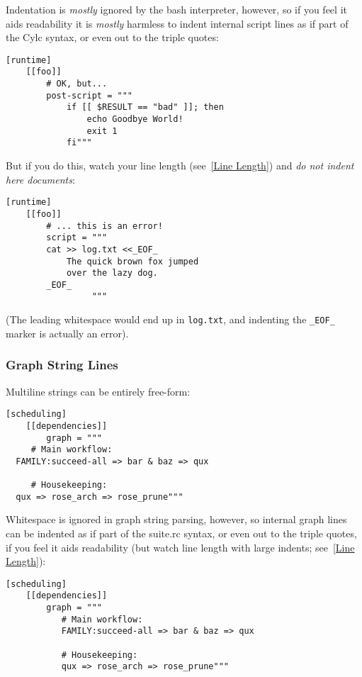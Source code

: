Indentation is {\em mostly} ignored by the bash interpreter, however, so if you
feel it aids readability it is {\em mostly} harmless to indent internal script
lines as if part of the Cylc syntax, or even out to the triple quotes:

\lstset{language=suiterc}
\begin{lstlisting}
[runtime]
    [[foo]]
        # OK, but...
        post-script = """
            if [[ $RESULT == "bad" ]]; then
                echo Goodbye World!
                exit 1
            fi"""
\end{lstlisting}

But if you do this, watch your line length (see~\ref{Line Length}) and {\em do not
indent here documents}:

\lstset{language=suiterc}
\begin{lstlisting}
[runtime]
    [[foo]]
        # ... this is an error!
        script = """
        cat >> log.txt <<_EOF_
            The quick brown fox jumped
            over the lazy dog.
        _EOF_
                 """
\end{lstlisting}

(The leading whitespace would end up in \lstinline=log.txt=, and indenting the
\lstinline=_EOF_= marker is actually an error).

\subsubsection{Graph String Lines}

Multiline \lstinline@graph@ strings can be entirely free-form:

\lstset{language=suiterc}
\begin{lstlisting}
[scheduling]
    [[dependencies]]
        graph = """
     # Main workflow:
  FAMILY:succeed-all => bar & baz => qux

     # Housekeeping:
  qux => rose_arch => rose_prune"""
\end{lstlisting}

Whitespace is ignored in graph string parsing, however, so internal graph lines
can be indented as if part of the suite.rc syntax, or even out to the triple
quotes, if you feel it aids readability (but watch line length with large
indents; see~\ref{Line Length}):

\lstset{language=suiterc}
\begin{lstlisting}
[scheduling]
    [[dependencies]]
        graph = """
           # Main workflow:
           FAMILY:succeed-all => bar & baz => qux

           # Housekeeping:
           qux => rose_arch => rose_prune"""
\end{lstlisting}

